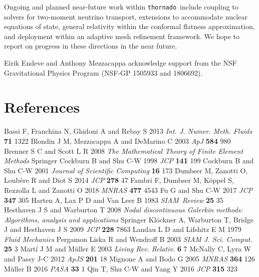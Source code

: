 \documentclass[letterpaper]{jpconf}
\newcommand{\thornado}{\texttt{thornado}}
\begin{document}
Ongoing and planned near-future work within \thornado\ include coupling to solvers for two-moment neutrino transport, extensions to accommodate nuclear equations of state, general relativity within the conformal flatness approximation, and deployment within an adaptive mesh refinement framework.  
We hope to report on progress in these directions in the near future.  

\ack Eirik Endeve and Anthony Mezzacappa acknowledge support from the NSF Gravitational Physics Program (NSF-GP 1505933 and 1806692).

\section*{References}
\begin{thebibliography}{34}
   Bassi F, Franchina N, Ghidoni A and Rebay S 2013 {\it Int. J. Numer. Meth. Fluids} {\bf 71} 1322
   Blondin J M, Mezzacappa A and DeMarino C 2003 {\it ApJ} {\bf 584} 980
   Brenner S C and Scott L R 2008 {\it The Mathematical Theory of Finite Element Methods} Springer
   Cockburn B and Shu C-W 1998 {\it JCP} {\bf 141} 199
   Cockburn B and Shu C-W 2001 {\it Journal of Scientific Computing} {\bf 16} 173
   Dumbser M, Zanotti O, Loub{\`e}re R and Diot S 2014 {\it JCP} {\bf 278} 47
   Fambri F, Dumbser M, K{\"o}ppel S, Rezzolla L and Zanotti O 2018 {\it MNRAS} {\bf 477} 4543
   Fu G and Shu C-W 2017 {\it JCP} {\bf 347} 305
   Harten A, Lax P D and Van Leer B 1983 {\it SIAM~Review} {\bf 25} 35
   Hesthaven J S and Warburton T 2008 {\it Nodal discontinuous Galerkin methods: Algorithms, analysis and applications} Springer
   Kl{\"o}ckner A, Warburton T, Bridge J and Hesthaven J S 2009 {\it JCP} {\bf 228} 7863
   Landau L D and Lifshitz E M 1979 {\it Fluid Mechanics} Pergamon
   Liska R and Wendroff B 2003 {\it SIAM J. Sci. Comput.} {\bf 25} 3
   Mart{\'i} J M and M{\"u}ller E 2003 {\it Living Rev. Relativ.} {\bf 6} 7
   McNally C, Lyra W and Passy J-C 2012 {\it ApJS} {\bf 201} 18
   Mignone A and Bodo G 2005 {\it MNRAS} {\bf 364} 126
   M{\"u}ller B 2016 {\it PASA} {\bf 33} 1
   Qin T, Shu C-W and Yang Y 2016 {\it JCP} {\bf 315} 323

\end{thebibliography}
\end{document}
